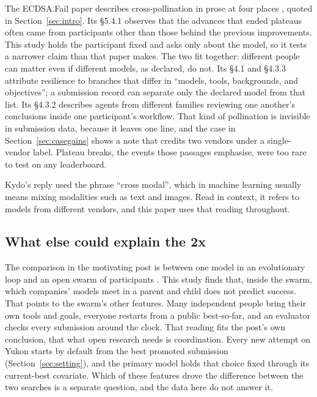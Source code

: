 The ECDSA.Fail paper describes cross-pollination in prose at four places \citep{long2026ecdsafail}, quoted in Section~\ref{sec:intro}.
Its \S5.4.1 observes that the advances that ended plateaus often came from participants other than those behind the previous improvements.
This study holds the participant fixed and asks only about the model, so it tests a narrower claim than that paper makes.
The two fit together: different people can matter even if different models, as declared, do not.
Its \S4.1 and \S4.3.3 attribute resilience to branches that differ in ``models, tools, backgrounds, and objectives''; a submission record can separate only the declared model from that list.
Its \S4.3.2 describes agents from different families reviewing one another's conclusions inside one participant's workflow.
That kind of pollination is invisible in submission data, because it leaves one  line, and the case in Section~\ref{sec:casegains} shows a note that credits two vendors under a single-vendor label.
Plateau breaks, the events those passages emphasise, were too rare to test on any leaderboard.

Kydo's reply used the phrase ``cross modal'', which in machine learning usually means mixing modalities such as text and images.
Read in context, it refers to models from different vendors, and this paper uses that reading throughout.

\subsection{What else could explain the 2x}

The comparison in the motivating post \citep{kannan2026post} is between one model in an evolutionary loop \citep{gu2026discovering} and an open swarm of participants \citep{long2026ecdsafail}.
This study finds that, inside the swarm, which companies' models meet in a parent and child does not predict success.
That points to the swarm's other features.
Many independent people bring their own tools and goals, everyone restarts from a public best-so-far, and an evaluator checks every submission around the clock.
That reading fits the post's own conclusion, that what open research needs is coordination.
Every new attempt on Yukon starts by default from the best promoted submission (Section~\ref{sec:setting}), and the primary model holds that choice fixed through its current-best covariate.
Which of these features drove the difference between the two searches is a separate question, and the data here do not answer it.

